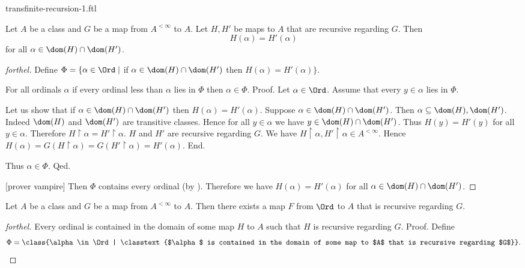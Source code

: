\documentclass{naproche-library}
\begin{document}
\begin{smodule}{transfinite-recursion-1.ftl}

  \begin{lemma*}[forthel,title=Coincidence Lemma,id=transfinite-recursion_coincidence]
    Let $A$ be a class and $G$ be a map from $A^{< \infty}$ to $A$.
    Let $H, H'$ be maps to $A$ that are recursive regarding $G$.
    Then \[ H(\alpha) = H'(\alpha) \] for all $\alpha \in \dom(H) \cap \dom(H')$.
  \end{lemma*}
  \begin{proof}[forthel]
    Define $\Phi = \{ \alpha \in \Ord \mid$ if
    $\alpha \in \dom(H) \cap \dom(H')$ then $H(\alpha) = H'(\alpha) \}$.

    For all ordinals $\alpha$ if every ordinal less than $\alpha$ lies in $\Phi$ then $\alpha \in \Phi$. \newline
    Proof.
      Let $\alpha \in \Ord$.
      Assume that every $y \in \alpha$ lies in $\Phi$.

      Let us show that if $\alpha \in \dom(H) \cap \dom(H')$ then
      $H(\alpha) = H'(\alpha)$.
        Suppose $\alpha \in \dom(H) \cap \dom(H')$.
        Then $\alpha \subseteq \dom(H), \dom(H')$.
        Indeed $\dom(H)$ and $\dom(H')$ are transitive classes.
        Hence for all $y \in \alpha$ we have $y \in \dom(H) \cap \dom(H')$.
        Thus $H(y) = H'(y)$ for all $y \in \alpha$.
        Therefore $H \restriction \alpha = H' \restriction \alpha$.
        $H$ and $H'$ are recursive regarding $G$.
        We have $H \restriction \alpha, H' \restriction \alpha \in A^{< \infty}$.
        Hence $H(\alpha)
          = G(H \restriction \alpha)
          = G(H' \restriction \alpha)
          = H'(\alpha)$.
      End.

      Thus $\alpha \in \Phi$.
    Qed.

    [prover vampire]
    Then $\Phi$ contains every ordinal (by ).
    Therefore we have $H(\alpha) = H'(\alpha)$ for all $\alpha \in \dom(H) \cap \dom(H')$.
  \end{proof}
  
  \begin{theorem*}[forthel,title=Transfinite Recursion Theorem: Existence,id=transfinite-recursion_existence]
    Let $A$ be a class and $G$ be a map from $A^{< \infty}$ to $A$.
    Then there exists a map $F$ from $\Ord$ to $A$ that is recursive regarding $G$.
  \end{theorem*}
  \begin{proof}[forthel]
    Every ordinal is contained in the domain of some map $H$ to $A$ such that $H$ is recursive regarding $G$. \newline
    Proof.
      Define \[ \Phi = \class{\alpha \in \Ord | \classtext{$\alpha$ is contained in the domain of some map to $A$ that is recursive regarding $G$}}. \]


\end{proof}
\end{smodule}
\end{document}
